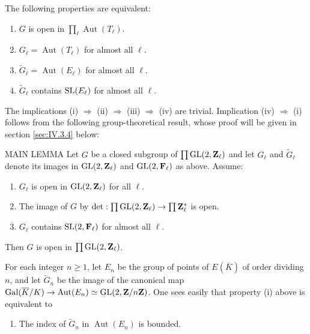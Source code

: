 \begin{proposition}
The following properties are equivalent:
\begin{enumerate}
\item[$\mathrm{(i)}$] $G$ is open in $\prod_{\ell}\operatorname{Aut}(T_\ell)$.
\item[$\mathrm{(ii)}$] $G_\ell = \operatorname{Aut}(T_\ell)$ for almost all $\ell$.
\item[$\mathrm{(iii)}$] $\widetilde{G}_\ell = \operatorname{Aut}(E_\ell)$ for almost all $\ell$.
\item[$\mathrm{(iv)}$] $\widetilde{G}_\ell$ contains $\mathrm{SL}(E_\ell)$ for almost all $\ell$.
\end{enumerate}
\end{proposition}

The implications (i) $\Rightarrow$ (ii) $\Rightarrow$ (iii) $\Rightarrow$ (iv) are trivial. Implication (iv) $\Rightarrow$ (i) follows from the following group-theoretical result, whose proof will be given in section \ref{sec:IV.3.4} below:

\begin{stmt}{MAIN LEMMA}{}
Let $G$ be a closed subgroup of $\prod \mathrm{GL}(2,\mathbf{Z}_\ell)$ and let $G_\ell$ and $\widetilde{G}_\ell$ denote its images in $\mathrm{GL}(2,\mathbf{Z}_\ell)$ and $\mathrm{GL}(2,\mathbf{F}_\ell)$ as above. Assume:
\begin{enumerate}
\item[$\mathrm{(a)}$] $G_\ell$ is open in $\mathrm{GL}(2,\mathbf{Z}_\ell)$ for all $\ell$.
\item[$\mathrm{(b)}$] The image of $G$ by $\det : \prod \mathrm{GL}(2,\mathbf{Z}_\ell) \to \prod \mathbf{Z}_\ell^{*}$ is open.
\item[$\mathrm{(c)}$] $G_\ell$ contains $\mathrm{SL}(2,\mathbf{F}_\ell)$ for almost all $\ell$.
\end{enumerate}
Then $G$ is open in $\prod \mathrm{GL}(2,\mathbf{Z}_\ell)$.
\end{stmt}

\begin{remarks}
For each integer $n \geq 1$, let $E_n$ be the group of points of $E(\overline{K})$ of order dividing $n$, and let $\widetilde{G}_n$ be the image of the canonical map $\operatorname{Gal}(\overline{K}/K) \to \operatorname{Aut}(E_n) \simeq \mathrm{GL}(2,\mathbf{Z}/n\mathbf{Z})$. One sees easily that property (i) above is equivalent to
\begin{enumerate}
\item[$\mathrm{(i')}$] The index of $\widetilde{G}_n$ in $\operatorname{Aut}(E_n)$ is bounded.
\end{enumerate}
\end{remarks}

